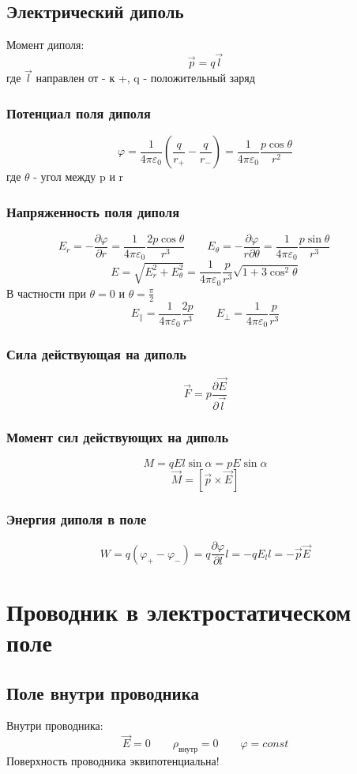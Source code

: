 \documentclass{article}
\begin{document}
\subsection{Электрический диполь}
Момент диполя:
\[\vec{p}=q\vec{l}\]
где $\vec{l}$ направлен от - к +, q - положительный заряд
\subsubsection{Потенциал поля диполя}
\[
    \varphi=\frac{1}{4\pi\varepsilon_{0}}(\frac{q}{r_{+}}-\frac{q}{r_{-}})=
    \frac{1}{4\pi\varepsilon_{0}}\frac{p\cos\theta}{r^2}
\]
где $\theta$ - угол между p и r
\subsubsection{Напряженность поля диполя}
\[
    E_{r}=-\frac{\partial\varphi}{\partial r}=\frac{1}{4\pi\varepsilon_{0}}\frac{2p\cos\theta}{r^3} \qquad
    E_{\theta}=-\frac{\partial\varphi}{r\partial\theta}=\frac{1}{4\pi\varepsilon_{0}}\frac{p\sin\theta}{r^3} \qquad
\]
\[E=\sqrt{E_{r}^2+E_{\theta}^2}=\frac{1}{4\pi\varepsilon_{0}}\frac{p}{r^3}\sqrt{1+3\cos^2\theta}\]
В частности при $\theta = 0$ и $\theta = \frac{\pi}{2}$
\[
    E_{\parallel} = \frac{1}{4\pi\varepsilon_{0}}\frac{2p}{r^3} \qquad
    E_{\perp} = \frac{1}{4\pi\varepsilon_{0}}\frac{p}{r^3}
\]
\subsubsection{Сила действующая на диполь}
\[\vec{F}=p\frac{\partial\vec{E}}{\partial\vec{l}}\]
\subsubsection{Момент сил действующих на диполь}
\[M=qEl\sin\alpha=pE\sin\alpha\]
\[\vec{M}=[\vec{p}\times\vec{E}]\]
\subsubsection{Энергия диполя в поле}
\[W=q(\varphi_{+}-\varphi_{-})=q\frac{\partial\varphi}{\partial l}l=-qE_{l}l=-\vec{p}\vec{E}\]


\section{Проводник в электростатическом поле}

\subsection{Поле внутри проводника}
Внутри проводника:
\[
    \vec{E}=0 \qquad \rho_{\text{внутр}}=0 \qquad \varphi=const
\]
Поверхность проводника эквипотенциальна!
\end{document}
